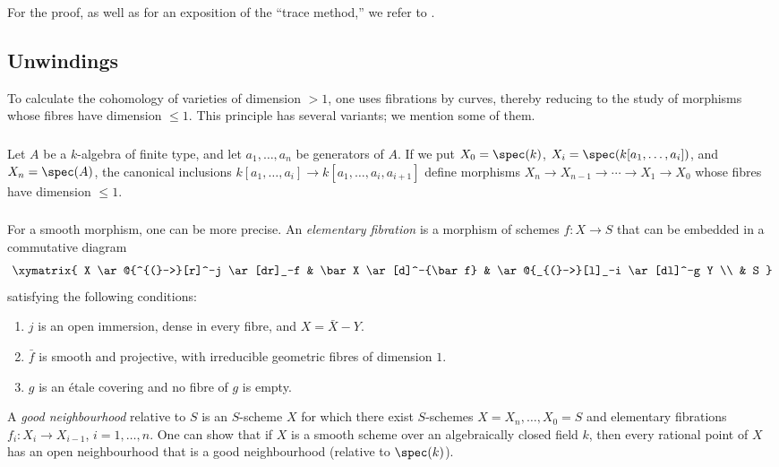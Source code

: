 For the proof, as well as for an exposition of the “trace method,” we
refer to \cite[IX 5]{sga4}.

\subsection{Unwindings}\label{I:3-4}

To calculate the cohomology of varieties of dimension $>1$, one uses
fibrations by curves, thereby reducing to the study of morphisms whose
fibres have dimension $\leqslant1$. This principle has several variants;
we mention some of them.

\subsubsection{}\label{I:3-4-1}

Let $A$ be a $k$-algebra of finite type, and let $a_1,\dotsc,a_n$ be
generators of $A$. If we put $X_0=\spec(k)$,
$X_i=\spec(k[a_1,\dotsc,a_i])$, and $X_n=\spec(A)$, the canonical
inclusions
$k[a_1,\dotsc,a_i]\to k[a_1,\dotsc,a_i,a_{i+1}]$ define morphisms
$X_n\to X_{n-1}\to\cdots\to X_1\to X_0$ whose fibres have dimension
$\leqslant1$.

\subsubsection{}\label{I:3-4-2}

For a smooth morphism, one can be more precise. An
\emph{elementary fibration} is a morphism of schemes $f:X\to S$ that
can be embedded in a commutative diagram
\[\xymatrix{
  X \ar@{^{(}->}[r]^-j \ar[dr]_-f
    & \bar X \ar[d]^-{\bar f}
    & \ar@{_{(}->}[l]_-i \ar[dl]^-g Y \\
  & S
}\]
satisfying the following conditions:
\begin{enumerate}[\indent i)]
  \item $j$ is an open immersion, dense in every fibre, and
    $X=\bar X- Y$.
  \item $\bar f$ is smooth and projective, with irreducible geometric
    fibres of dimension $1$.
  \item $g$ is an étale covering and no fibre of $g$ is empty.
\end{enumerate}

A \emph{good neighbourhood} relative to $S$ is an $S$-scheme $X$ for
which there exist $S$-schemes $X=X_n,\dotsc,X_0=S$ and elementary
fibrations $f_i:X_i\to X_{i-1}$, $i=1,\dotsc,n$. One can show
\cite[XI 3.3]{sga4} that if $X$ is a smooth scheme over an algebraically
closed field $k$, then every rational point of $X$ has an open
neighbourhood that is a good neighbourhood (relative to $\spec(k)$).

